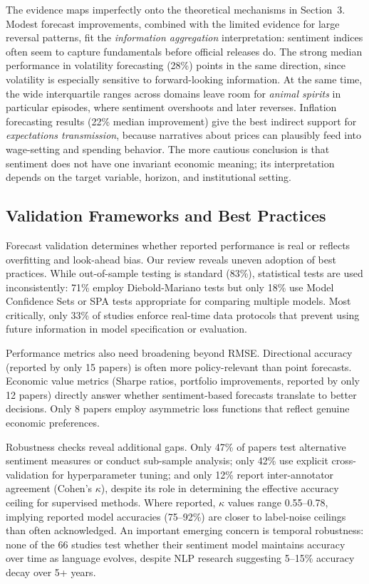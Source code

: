 \documentclass[12pt,oneside]{article}
\begin{document}
The evidence maps imperfectly onto the theoretical mechanisms in Section~3. Modest forecast improvements, combined with the limited evidence for large reversal patterns, fit the \textit{information aggregation} interpretation: sentiment indices often seem to capture fundamentals before official releases do. The strong median performance in volatility forecasting (28\%) points in the same direction, since volatility is especially sensitive to forward-looking information. At the same time, the wide interquartile ranges across domains leave room for \textit{animal spirits} in particular episodes, where sentiment overshoots and later reverses. Inflation forecasting results (22\% median improvement) give the best indirect support for \textit{expectations transmission}, because narratives about prices can plausibly feed into wage-setting and spending behavior. The more cautious conclusion is that sentiment does not have one invariant economic meaning; its interpretation depends on the target variable, horizon, and institutional setting.

\subsection{Validation Frameworks and Best Practices}

Forecast validation determines whether reported performance is real or reflects overfitting and look-ahead bias. Our review reveals uneven adoption of best practices. While out-of-sample testing is standard (83\%), statistical tests are used inconsistently: 71\% employ Diebold-Mariano tests but only 18\% use Model Confidence Sets or SPA tests appropriate for comparing multiple models. Most critically, only 33\% of studies enforce real-time data protocols that prevent using future information in model specification or evaluation.

Performance metrics also need broadening beyond RMSE. Directional accuracy (reported by only 15 papers) is often more policy-relevant than point forecasts. Economic value metrics (Sharpe ratios, portfolio improvements, reported by only 12 papers) directly answer whether sentiment-based forecasts translate to better decisions. Only 8 papers employ asymmetric loss functions that reflect genuine economic preferences.

Robustness checks reveal additional gaps. Only 47\% of papers test alternative sentiment measures or conduct sub-sample analysis; only 42\% use explicit cross-validation for hyperparameter tuning; and only 12\% report inter-annotator agreement (Cohen's $\kappa$), despite its role in determining the effective accuracy ceiling for supervised methods. Where reported, $\kappa$ values range 0.55--0.78, implying reported model accuracies (75--92\%) are closer to label-noise ceilings than often acknowledged. An important emerging concern is temporal robustness: none of the 66 studies test whether their sentiment model maintains accuracy over time as language evolves, despite NLP research suggesting 5--15\% accuracy decay over 5+ years.
\end{document}
